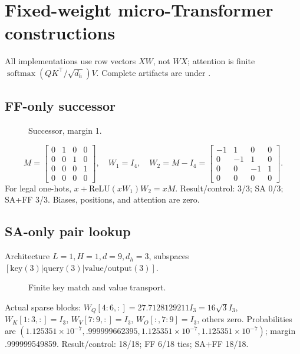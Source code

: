 \documentclass[10pt]{article}
\begin{document}
\appendix
\section{Fixed-weight micro-Transformer constructions}
All implementations use row vectors $XW$, not $WX$; attention is finite $\operatorname{softmax}(QK^\top/\sqrt{d_h})V$. Complete artifacts are under .

\subsection{FF-only successor}
\begin{figure}[H]\centering{}\caption{Successor, margin 1.}\end{figure}
\[
M=\begin{bmatrix}0&1&0&0\\0&0&1&0\\0&0&0&1\\0&0&0&0\end{bmatrix},\quad W_1=I_4,\quad W_2=M-I_4=\begin{bmatrix}-1&1&0&0\\0&-1&1&0\\0&0&-1&1\\0&0&0&0\end{bmatrix}.
\]
For legal one-hots, $x+\mathrm{ReLU}(xW_1)W_2=xM$. Result/control: 3/3; SA 0/3; SA+FF 3/3. Biases, positions, and attention are zero.

\subsection{SA-only pair lookup}
Architecture $L=1,H=1,d=9,d_h=3$, subspaces $[\mathrm{key}(3)|\mathrm{query}(3)|\mathrm{value/output}(3)]$.
\begin{figure}[H]\centering{}\caption{Finite key match and value transport.}\end{figure}
Actual sparse blocks: $W_Q[4{:}6,:]=27.7128129211I_3=16\sqrt3I_3$, $W_K[1{:}3,:]=I_3$, $W_V[7{:}9,:]=I_3$, $W_O[:,7{:}9]=I_3$, others zero. Probabilities are $(1.125351\!\times\!10^{-7},.999999662395,1.125351\!\times\!10^{-7},1.125351\!\times\!10^{-7})$; margin .999999549859. Result/control: 18/18; FF 6/18 ties; SA+FF 18/18.
\end{document}
